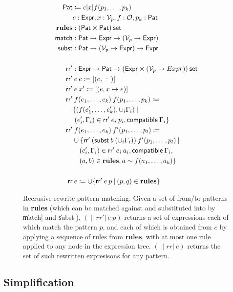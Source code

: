\documentclass[paper.tex]{subfiles}
\begin{document}
\begin{figure}
\begin{align*}
  \Pat &\ceq c | x | f(p_1, \dotsc, p_k) \\
  & c : \Expr, x : \Var_p, f : \Op, p_k : \Pat \\
  \mathbf{rules} &: (\Pat \times \Pat)\:\|set| \\
  \|match| &: \Pat \to \Expr \to (\Var_p \to \Expr) \\
  \|subst| &: \Pat \to (\Var_p \to \Expr) \to \Expr \\
  \\
  \|rr'| &: \Expr \to \Pat \to (\Expr \times (\Var_p \to Expr))\:\|set| \\
  \|rr'| &\:e\:e \ceq [ (e, \cdot) ] \\
  \|rr'| &\:e\:x' \ceq [ (e, x \mapsto e) ] \\
  \|rr'| &\:f(e_1, \dotsc, e_k)\:f(p_1, \dotsc, p_k) \ceq \\
  & \{ ( f(e_1', \dotsc, e_k'), \cup_i \Gamma_i) \I \\
  & \; (e_i', \Gamma_i) \in \|rr'|\:e_i\:p_i, \|compatible|\:\Gamma_i \} \\
  \|rr'| &\:f(e_1, \dotsc, e_k)\:f'(p_1, \dotsc, p_l) \ceq \\
  & \cup \{ \|rr'|\:(\|subst|\:b\:(\cup_i \Gamma_i))\:f'(p_1, \dotsc, p_l) \I \\
  & \quad (e_i', \Gamma_i) \in \|rr'|\:e_i\:a_i, \|compatible|\:\Gamma_i, \\
  & \quad (a, b) \in \mathbf{rules}, a \sim f(a_1, \dotsc, a_k) \} \\
  \\
  \|rr| &\:e\ceq \cup \{ \|rr'|\:e\:p \I (p, q) \in \mathbf{rules} \}
\end{align*}
\caption{Recrusive rewrite pattern matching.
  Given a set of from/to patterns in \textbf{rules}
  (which can be matched against and substituted into
  by \|match| and \|subst|),
  $(\|rr'|\:e\:p)$ returns a set of expressions
  each of which match the pattern $p$, and each of which is obtained from $e$
  by applying a sequence of rules from \textbf{rules},
  with at most one rule applied to any node in the expression tree.
  $(\|rr|\:e)$ returns the set of such rewritten expresisons for any pattern.}
\label{alg:rm}
\end{figure}

\subsection{Simplification}
\end{document}
